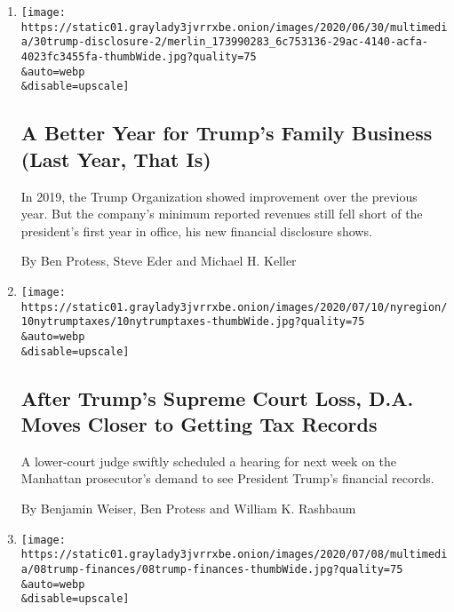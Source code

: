 \begin{enumerate}
\def\labelenumi{\arabic{enumi}.}
\item
  \href{/2020/07/31/business/trump-financial-disclosure.html}{}

  \texttt{[image: https://static01.graylady3jvrrxbe.onion/images/2020/06/30/multimedia/30trump-disclosure-2/merlin\_173990283\_6c753136-29ac-4140-acfa-4023fc3455fa-thumbWide.jpg?quality=75\\\&auto=webp\\\&disable=upscale]}

  \hypertarget{a-better-year-for-trumps-family-business-last-year-that-is}{%
  \subsection{A Better Year for Trump's Family Business (Last Year, That
  Is)}\label{a-better-year-for-trumps-family-business-last-year-that-is}}

  In 2019, the Trump Organization showed improvement over the previous
  year. But the company's minimum reported revenues still fell short of
  the president's first year in office, his new financial disclosure
  shows.

  By Ben Protess, Steve Eder and Michael H. Keller
\item
  \href{/2020/07/10/nyregion/donald-trump-taxes-cy-vance.html}{}

  \texttt{[image: https://static01.graylady3jvrrxbe.onion/images/2020/07/10/nyregion/10nytrumptaxes/10nytrumptaxes-thumbWide.jpg?quality=75\\\&auto=webp\\\&disable=upscale]}

  \hypertarget{after-trumps-supreme-court-loss-da-moves-closer-to-getting-tax-records}{%
  \subsection{After Trump's Supreme Court Loss, D.A. Moves Closer to
  Getting Tax
  Records}\label{after-trumps-supreme-court-loss-da-moves-closer-to-getting-tax-records}}

  A lower-court judge swiftly scheduled a hearing for next week on the
  Manhattan prosecutor's demand to see President Trump's financial
  records.

  By Benjamin Weiser, Ben Protess and William K. Rashbaum
\item
  \href{/2020/07/08/us/politics/trump-financial-disclosure.html}{}

  \texttt{[image: https://static01.graylady3jvrrxbe.onion/images/2020/07/08/multimedia/08trump-finances/08trump-finances-thumbWide.jpg?quality=75\\\&auto=webp\\\&disable=upscale]}


\end{enumerate}
